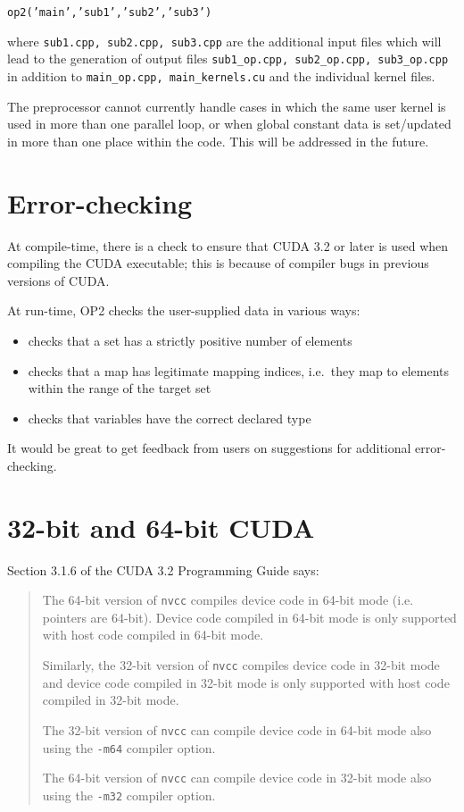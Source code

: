\documentclass[11pt]{article}
\begin{document}
{\tt op2('main','sub1','sub2','sub3')}

\noindent
where {\tt sub1.cpp, sub2.cpp, sub3.cpp} are the additional input files which will 
lead to the generation of output files {\tt sub1\_op.cpp, sub2\_op.cpp, sub3\_op.cpp} 
in addition to {\tt main\_op.cpp, main\_kernels.cu} and the individual kernel files.

The preprocessor cannot currently handle cases in which the same user kernel is 
used in more than one parallel loop, or when global constant data is set/updated 
in more than one place within the code.  This will be addressed in the future.


\section{Error-checking}

At compile-time, there is a check to ensure that CUDA 3.2 or later is used
when compiling the CUDA executable; this is because of compiler bugs in previous
versions of CUDA.

At run-time, OP2 checks the user-supplied data in various ways:
\begin{itemize}
\item
checks that a set has a strictly positive number of elements
\item
checks that a map has legitimate mapping indices, 
i.e.~they map to elements within the range of the target set
\item
checks that variables have the correct declared type
\end{itemize}



It would be great to get feedback from users on suggestions for 
additional error-checking.


\section{32-bit and 64-bit CUDA}

Section 3.1.6 of the CUDA 3.2 Programming Guide says:
\begin{quotation}
The 64-bit version of {\tt nvcc} compiles device code in 64-bit mode 
(i.e. pointers are 64-bit). Device code compiled in 64-bit mode 
is only supported with host code compiled in 64-bit mode.

Similarly, the 32-bit version of {\tt nvcc} compiles device code in 
32-bit mode and device code compiled in 32-bit mode is only 
supported with host code compiled in 32-bit mode.

The 32-bit version of {\tt nvcc} can compile device code in 64-bit mode 
also using the {\tt -m64} compiler option.

The 64-bit version of {\tt nvcc} can compile device code in 32-bit mode 
also using the {\tt -m32} compiler option.
\end{quotation}
\end{document}
